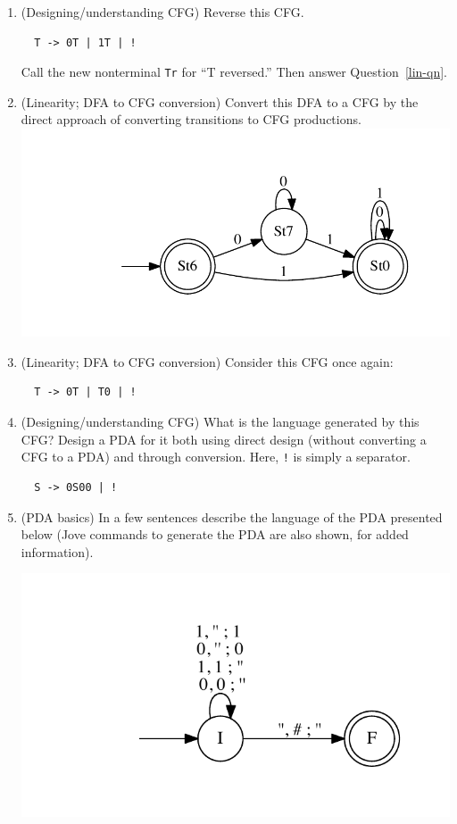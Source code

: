 \documentclass[12pt]{article}
\begin{document}
\begin{large}
\begin{enumerate}
\item (Designing/understanding CFG)
  Reverse this CFG. 
\begin{verbatim}
  T -> 0T | 1T | !
\end{verbatim}
Call the new nonterminal {\tt Tr} for ``T reversed.''
Then answer Question~\ref{lin-qn}.


\item (Linearity; DFA to CFG conversion)
  Convert this DFA to a CFG by the direct approach of converting
  transitions to CFG productions.
  \includegraphics[width=.4\linewidth]{DO_odd1s.pdf}

  
\item (Linearity; DFA to CFG conversion)
  Consider this CFG once again:
\begin{verbatim}
  T -> 0T | T0 | !
\end{verbatim}

  
\item (Designing/understanding CFG) What is the language
  generated by this CFG? Design a PDA for it both using direct design (without
  converting a CFG to a PDA)
  and through conversion. Here, \verb|!| is simply a separator.
\begin{verbatim}
  S -> 0S00 | !
\end{verbatim}

  
\item (PDA basics)
  In a few sentences describe the language of the PDA presented below
  (Jove commands to generate the PDA are also shown, for added information).
  
  \includegraphics[width=.4\linewidth]{DO_pda1.pdf}


\end{enumerate}
\end{large}
\end{document}
